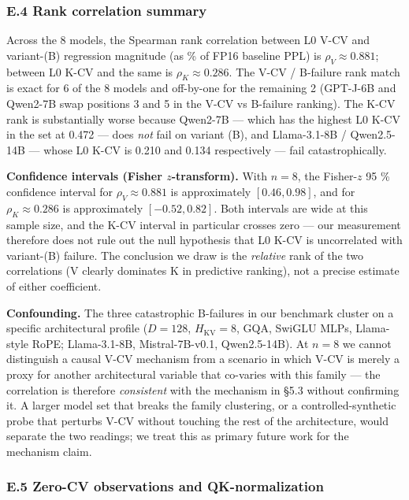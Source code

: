 \documentclass[
]{article}
\begin{document}
\subsubsection{E.4 Rank correlation
summary}\label{e.4-rank-correlation-summary}

Across the 8 models, the Spearman rank correlation between L0 V-CV and
variant-(B) regression magnitude (as \% of FP16 baseline PPL) is
\(\rho_V \approx 0.881\); between L0 K-CV and the same is
\(\rho_K \approx 0.286\). The V-CV / B-failure rank match is exact for 6
of the 8 models and off-by-one for the remaining 2 (GPT-J-6B and
Qwen2-7B swap positions 3 and 5 in the V-CV vs B-failure ranking). The
K-CV rank is substantially worse because Qwen2-7B --- which has the
highest L0 K-CV in the set at 0.472 --- does \emph{not} fail on variant
(B), and Llama-3.1-8B / Qwen2.5-14B --- whose L0 K-CV is 0.210 and 0.134
respectively --- fail catastrophically.

\textbf{Confidence intervals (Fisher \(z\)-transform).} With \(n = 8\),
the Fisher-\(z\) 95 \% confidence interval for \(\rho_V \approx 0.881\)
is approximately \([0.46, 0.98]\), and for \(\rho_K \approx 0.286\) is
approximately \([-0.52, 0.82]\). Both intervals are wide at this sample
size, and the K-CV interval in particular crosses zero --- our
measurement therefore does not rule out the null hypothesis that L0 K-CV
is uncorrelated with variant-(B) failure. The conclusion we draw is the
\emph{relative} rank of the two correlations (V clearly dominates K in
predictive ranking), not a precise estimate of either coefficient.

\textbf{Confounding.} The three catastrophic B-failures in our benchmark
cluster on a specific architectural profile (\(D = 128\),
\(H_{\mathrm{KV}} = 8\), GQA, SwiGLU MLPs, Llama-style RoPE;
Llama-3.1-8B, Mistral-7B-v0.1, Qwen2.5-14B). At \(n = 8\) we cannot
distinguish a causal V-CV mechanism from a scenario in which V-CV is
merely a proxy for another architectural variable that co-varies with
this family --- the correlation is therefore \emph{consistent} with the
mechanism in §5.3 without confirming it. A larger model set that breaks
the family clustering, or a controlled-synthetic probe that perturbs
V-CV without touching the rest of the architecture, would separate the
two readings; we treat this as primary future work for the mechanism
claim.

\subsubsection{E.5 Zero-CV observations and
QK-normalization}\label{e.5-zero-cv-observations-and-qk-normalization}
\end{document}
